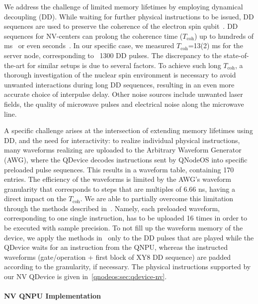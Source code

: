 We address the challenge of limited memory lifetimes by employing dynamical decoupling (DD).  While waiting for further physical instructions to be issued, DD sequences are used to preserve the coherence of the electron spin qubit~\cite{de_lange_universal_2010}. DD sequences for NV-centers can prolong the coherence time ($T_{\text{coh}}$) up to hundreds of ms~\cite{hermans2022qubit} or even seconds~\cite{abobeih_2018_one_sec}. In our specific case, we measured $T_{\text{coh}}$=13(2) ms for the server node, corresponding to ~1300 DD pulses. The discrepancy to the state-of-the-art for similar setups is due to several factors. To achieve such long $T_{\text{coh}}$, a thorough investigation of the nuclear spin environment is necessary to avoid unwanted interactions during long DD sequences, resulting in an even more accurate choice of interpulse delay. Other noise sources include unwanted laser fields, the quality of microwave pulses and electrical noise along the microwave line.  

A specific challenge arises at the intersection of extending memory lifetimes using DD, and the need for interactivity: to realize individual physical instructions, many waveforms realizing are uploaded to the Arbitrary Waveform Generator (AWG), where the QDevice decodes instructions sent by QNodeOS into specific preloaded pulse sequences. This results in a waveform table, containing 170 entries. The efficiency of the waveforms is limited by the AWG's waveform granularity that corresponds to steps that are multiples of 6.66 ns, having a direct impact on the $T_{\text{coh}}$. We are able to partially overcome this limitation through the methods described in~\cite{corna_efficient_2021}. Namely, each preloaded waveform, corresponding to one single instruction, has to be uploaded 16 times in order to be executed with sample precision. To not fill up the waveform memory of the device, we apply the methods in~\cite{corna_efficient_2021} only to the DD pulses that are played while the QDevice waits for an instruction from the QNPU, whereas the instructed waveforms (gate/operation + first block of XY8 DD sequence) are padded according to the granularity, if necessary.
The physical instructions supported by our NV QDevice is given in~\cref{qnodeos:sec:qdevice-nv}.

\paragraph{NV QNPU Implementation}

